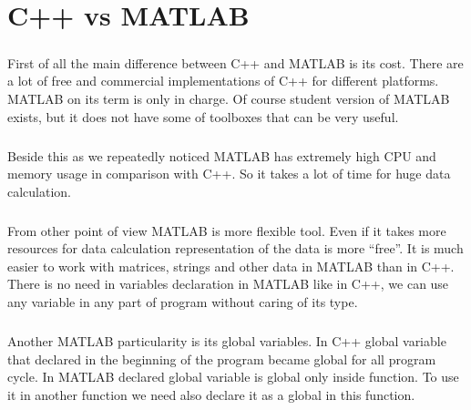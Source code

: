 
\chapter{C++  vs MATLAB} %

\label{Chapter8} %



\paragraph{}
	First of all the main difference between C++ and MATLAB is its cost. There are a lot of free and commercial implementations of C++ for different platforms. MATLAB on its term is only in charge. Of course student version of MATLAB exists, but it does not have some of toolboxes that can be very useful. 

\paragraph{}
	Beside this as we repeatedly noticed MATLAB has extremely high CPU and memory usage in comparison with C++. So it takes a lot of time for huge data calculation.

\paragraph{}
	From other point of view MATLAB is more flexible tool. Even if it takes more resources for data calculation representation of the data is more “free”. It is much easier to work with matrices, strings and other data in MATLAB than in C++. There is no need in variables declaration in MATLAB like in C++, we can use any variable in any part of program without caring of its type.

\paragraph{}
	Another MATLAB particularity is its global variables. In C++ global variable that declared in the beginning of the program became global for all program cycle. In MATLAB declared global variable is global only inside function. To use it in another function we need also declare it as a global in this function.

